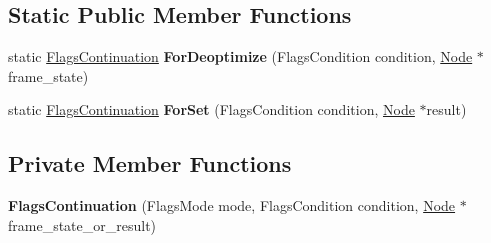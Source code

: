\subsection*{Static Public Member Functions}
\begin{DoxyCompactItemize}
\item 
static \hyperlink{classv8_1_1internal_1_1compiler_1_1_flags_continuation}{Flags\+Continuation} {\bfseries For\+Deoptimize} (Flags\+Condition condition, \hyperlink{classv8_1_1internal_1_1compiler_1_1_node}{Node} $\ast$frame\+\_\+state)\hypertarget{classv8_1_1internal_1_1compiler_1_1_flags_continuation_a37eb4583e316da9aa4cb49bf8ea7c656}{}\label{classv8_1_1internal_1_1compiler_1_1_flags_continuation_a37eb4583e316da9aa4cb49bf8ea7c656}

\item 
static \hyperlink{classv8_1_1internal_1_1compiler_1_1_flags_continuation}{Flags\+Continuation} {\bfseries For\+Set} (Flags\+Condition condition, \hyperlink{classv8_1_1internal_1_1compiler_1_1_node}{Node} $\ast$result)\hypertarget{classv8_1_1internal_1_1compiler_1_1_flags_continuation_a0bd7756ff7515a8408f8dd1f85cdf75e}{}\label{classv8_1_1internal_1_1compiler_1_1_flags_continuation_a0bd7756ff7515a8408f8dd1f85cdf75e}

\end{DoxyCompactItemize}
\subsection*{Private Member Functions}
\begin{DoxyCompactItemize}
\item 
{\bfseries Flags\+Continuation} (Flags\+Mode mode, Flags\+Condition condition, \hyperlink{classv8_1_1internal_1_1compiler_1_1_node}{Node} $\ast$frame\+\_\+state\+\_\+or\+\_\+result)\hypertarget{classv8_1_1internal_1_1compiler_1_1_flags_continuation_a4c2a5b947f45aec7cb04a2533d94264e}{}\label{classv8_1_1internal_1_1compiler_1_1_flags_continuation_a4c2a5b947f45aec7cb04a2533d94264e}

\end{DoxyCompactItemize}

